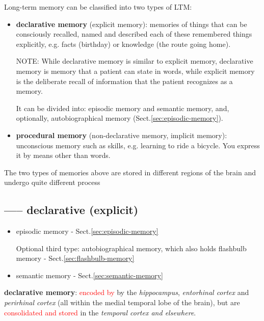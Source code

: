 Long-term memory can be classified into two types of LTM:
\begin{itemize}
  \item {\bf declarative memory} (explicit memory): memories of things that can
  be consciously recalled, named and described each of these remembered things
  explicitly, e.g.  facts (birthday) or knowledge (the route going home).

NOTE: While declarative memory is similar to explicit memory, declarative memory
is memory that a patient can state in words, while explicit memory is the
deliberate recall of information that the patient recognizes as a memory.

It can be divided into: episodic memory and semantic memory, and, optionally,
autobiographical memory (Sect.\ref{sec:episodic-memory}).


  \item {\bf procedural memory} (non-declarative memory, implicit memory):
  unconscious memory such as skills, e.g. learning to ride a bicycle.
  You express it by means other than words.
\end{itemize}

The two types of memories above are stored in different regions of the brain and
undergo quite different process

\subsection{----- declarative (explicit)}
\label{sec:LTM-declarative-memory}
\label{sec:declarative-memory}

\begin{itemize}
  \item episodic memory - Sect.\ref{sec:episodic-memory}
  
Optional third type:  autobiographical memory, which also holds flashbulb
memory - Sect.\ref{sec:flashbulb-memory}

  \item semantic memory - Sect.\ref{sec:semantic-memory}
\end{itemize}

{\bf declarative memory}: \textcolor{red}{encoded by}
  by the {\it hippocampus}, {\it entorhinal cortex} and {\it perirhinal cortex}
  (all within the medial temporal lobe of the brain), but are
  \textcolor{red}{consolidated and stored} in the {\it temporal cortex and
  elsewhere}.
  
